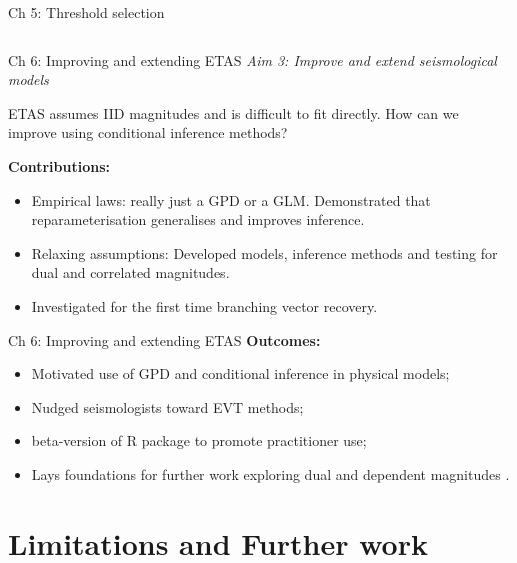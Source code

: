 \documentclass[10pt]{beamer}
\begin{document}
\begin{frame}{Ch 5: Threshold selection}
\begin{columns}
\begin{column}{0.4\textwidth}
\begin{center}
\end{center}
\end{column}
\end{columns}
\end{frame}



\begin{frame}{Ch 6: Improving and extending ETAS}
\textit{\color{orange} Aim 3: Improve and extend seismological models} 

ETAS assumes IID magnitudes and is difficult to fit directly. How can we improve using conditional inference methods? 

\vspace{1em}
\textbf{Contributions:} 
\begin{itemize}
\item Empirical laws: really just a GPD or a GLM.  Demonstrated that reparameterisation generalises and improves inference. 
\item Relaxing assumptions: Developed models, inference methods and testing for dual and correlated magnitudes.
\item Investigated for the first time branching vector recovery. 
\end{itemize}
\end{frame}



\begin{frame}{Ch 6: Improving and extending ETAS}
\textbf{Outcomes:}
\begin{itemize}
    \item Motivated use of GPD and conditional inference in physical models;\\[1em]
    \item Nudged seismologists toward EVT methods; \\[1em]
    \item beta-version of R package to promote practitioner use;\\[1em]
    \item Lays foundations for further work exploring dual and dependent magnitudes .
\end{itemize}
\end{frame}



\section{Limitations and Further work}
\end{document}
